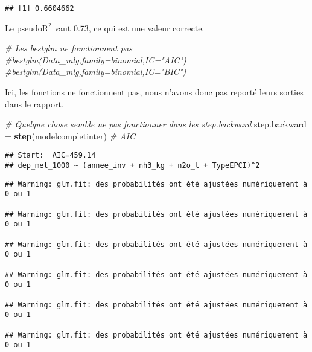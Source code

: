 \documentclass[
]{article}
\newenvironment{Shaded}{\begin{snugshade}}{\end{snugshade}}
\newcommand{\CommentTok}[1]{\textcolor[rgb]{0.56,0.35,0.01}{\textit{#1}}}
\newcommand{\DecValTok}[1]{\textcolor[rgb]{0.00,0.00,0.81}{#1}}
\newcommand{\FunctionTok}[1]{\textcolor[rgb]{0.13,0.29,0.53}{\textbf{#1}}}
\newcommand{\NormalTok}[1]{#1}
\newcommand{\OtherTok}[1]{\textcolor[rgb]{0.56,0.35,0.01}{#1}}
\newcommand{\SpecialCharTok}[1]{\textcolor[rgb]{0.81,0.36,0.00}{\textbf{#1}}}
\begin{document}
\begin{Shaded}
\end{Shaded}

\begin{verbatim}
## [1] 0.6604662
\end{verbatim}

Le \(\text{pseudoR}^2\) vaut 0.73, ce qui est une valeur correcte.

\begin{Shaded}
\begin{Highlighting}[]
\CommentTok{\# Les bestglm ne fonctionnent pas}
\CommentTok{\#bestglm(Data\_mlg,family=binomial,IC="AIC")}
\CommentTok{\#bestglm(Data\_mlg,family=binomial,IC="BIC")}
\end{Highlighting}
\end{Shaded}

Ici, les fonctions  ne fonctionnent pas, nous n'avons donc
pas reporté leurs sorties dans le rapport.

\begin{Shaded}
\begin{Highlighting}[]
\CommentTok{\# Quelque chose semble ne pas fonctionner dans les step.backward}
\NormalTok{step.backward }\OtherTok{=} \FunctionTok{step}\NormalTok{(modelcompletinter) }\CommentTok{\# AIC}
\end{Highlighting}
\end{Shaded}

\begin{verbatim}
## Start:  AIC=459.14
## dep_met_1000 ~ (annee_inv + nh3_kg + n2o_t + TypeEPCI)^2
\end{verbatim}

\begin{verbatim}
## Warning: glm.fit: des probabilités ont été ajustées numériquement à 0 ou 1

## Warning: glm.fit: des probabilités ont été ajustées numériquement à 0 ou 1

## Warning: glm.fit: des probabilités ont été ajustées numériquement à 0 ou 1

## Warning: glm.fit: des probabilités ont été ajustées numériquement à 0 ou 1

## Warning: glm.fit: des probabilités ont été ajustées numériquement à 0 ou 1

## Warning: glm.fit: des probabilités ont été ajustées numériquement à 0 ou 1
\end{verbatim}
\end{document}
